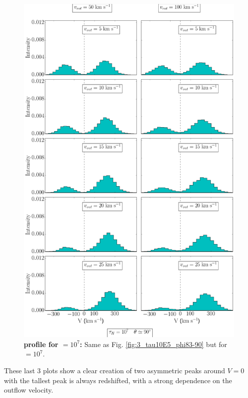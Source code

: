 \begin{figure}[h!]
	\begin{center}
		\includegraphics[height=0.8\textheight]{./figures/chapter3/3_tau10E7_phi83-90}
	\end{center}
	\caption{\textbf{\lya profile for \tauh$=10^7$:} Same as Fig. \ref{fig:3_tau10E5_phi83-90} but for \tauh$=10^7$.
		\label{fig:3_tau10E7_phi83-90}}
\end{figure}

\newpage

These last 3 plots show a clear creation of two asymmetric peaks around $V=0$ \kms with the tallest peak is always redshifted, with a strong dependence on the outflow velocity.\\


